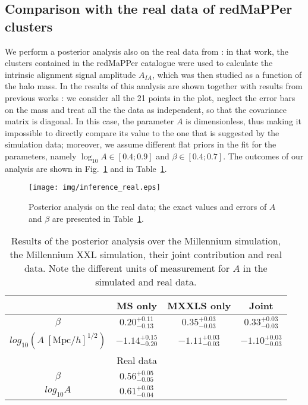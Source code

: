 \documentclass[a4paper,fleqn,usenatbib]{mnras}
\begin{document}
\subsection{Comparison with the real data of redMaPPer clusters}
We perform a posterior analysis also on the real data from \citet{vanUitertJoachimi2017}: in that work, the clusters contained in the redMaPPer catalogue \citep{Rykoffetal2014} were used to calculate the intrinsic alignment signal amplitude $A_{IA}$, which was then studied as a function of the halo mass. In \citet[figure 7]{vanUitertJoachimi2017} the results of this analysis are shown together with results from previous works \citep*{Joachimietal2011, Singhetal2015}: we consider all the 21 points in the plot, neglect the error bars on the mass
and treat all the the data as independent, so that the covariance matrix is diagonal. In this case, the parameter $A$ is dimensionless, thus making it impossible to directly compare its value to the one that is suggested by the simulation data; moreover, we assume different flat priors in the fit for the parameters, namely $\log_{10} A \in [0.4;0.9]$  and $\beta \in [0.4;0.7]$. The outcomes of our analysis are shown in Fig.~\ref{fig:postreal} and in Table~\ref{tab:param}.
\begin{figure}
	\centerline{
	\texttt{[image: img/inference\_real.eps]}}
	\caption{Posterior analysis on the real data; the exact values and errors of $A$ and $\beta$ are presented in Table~\ref{tab:param}.}
	\label{fig:postreal}
\end{figure}

\begin{table}
	\centering
	\caption{Results of the posterior analysis over the Millennium simulation, the Millennium XXL simulation, their joint contribution and real data. Note the different units of measurement for $A$ in the simulated and real data.}
	\label{tab:param}
	\begin{tabular}{c||ccc} %
		\hline
		\ & MS only & MXXLS only & Joint  \\
		\hline
		$\beta$					 & $0.20^{+0.11}_{-0.13}$   & $0.35^{+0.03}_{-0.03}$  & $0.33^{+0.03}_{-0.03}$ \\
		$log_{10} (A \ [\mbox{Mpc}/h]^{1/2})$ & $-1.14^{+0.15}_{-0.20}$ & $-1.11^{+0.03}_{-0.03}$ & $-1.10^{+0.03}_{-0.03}$ \\
		\hline
		\ & Real data & \ & \ \\
		\hline
		$\beta$ & $0.56^{+0.05}_{-0.05}$ & &\\
		$log_{10} A $ & $0.61^{+0.03}_{-0.04}$ & & \\
		\hline
	\end{tabular}
\end{table}
\end{document}
